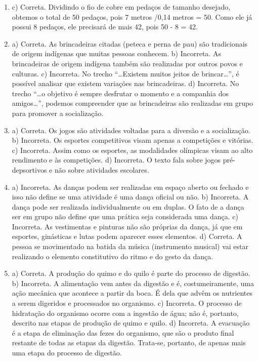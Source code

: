 \begin{enumerate}
\item
c) Correta. Dividindo o fio de cobre em pedaços de tamanho desejado, 
obtemos o total de 50 pedaços, pois 7 metros /0,14 metros = 50.
Como ele já possui 8 pedaços, ele precisará de mais 42, pois 50 - 8 = 42.

\item
a) Correta. As brincadeiras citadas (peteca e perna de pau) são tradicionais de origem indígenas que muitas pessoas
conhecem.
b) Incorreta. As brincadeiras de origem indígena também são
realizadas por outros povos e culturas.
c) Incorreta. No trecho “\ldots{}Existem muitos jeitos de
brincar\ldots{}”, é possível analisar que existem variações nas brincadeiras.
d) Incorreta. No trecho “\ldots{}o objetivo é sempre desfrutar o
momento e a companhia dos amigos\ldots{}”, podemos compreender que as
brincadeiras são realizadas em grupo para promover a socialização.

\item
a) Correta. Os jogos são atividades voltadas para a diversão e a socialização.
b) Incorreta. Os esportes competitivos visam apenas a competições e vitórias.
c) Incorreta. Assim como os esportes, as modalidades olímpicas
visam ao alto rendimento e às competições.
d) Incorreta. O texto fala sobre jogos pré-depsortivos e não
sobre atividades escolares.

\item
a) Incorreta. As danças podem ser realizadas em espaço aberto ou
fechado e isso não define se uma atividade é uma dança oficial ou não.
b) Incorreta. A dança pode ser realizada individualmente ou em
duplas. O fato de a dança ser em grupo não define que uma prática seja
considerada uma dança.
c) Incorreta. As vestimentas e pinturas não são próprias da
dança, já que em esportes, ginásticas e lutas podem aparecer esses elementos.
d) Correta. A pessoa se movimentado na batida da música
(instrumento musical) vai estar realizando o elemento constitutivo do
ritmo e do gesto da dança.

\item
a) Correta. A produção do quimo e do quilo
é parte do processo de digestão.
b) Incorreta. A alimentação vem antes da digestão e é, costumeiramente,
uma ação mecânica que acontece a partir da boca. É dela que advêm os
nutrientes a serem digeridos e processados no organismo. 
c) Incorreta. O processo de hidratação do organismo ocorre com a
ingestão de água; não é, portanto, descrito nas etapas de produção de
quimo e quilo.
d) Incorreta. A evacuação é a etapa de eliminação das fezes do
organismo, que são o produto final restante de todas as etapas da
digestão. Trata-se, portanto, de apenas mais uma etapa do processo
de digestão.


\end{enumerate}
